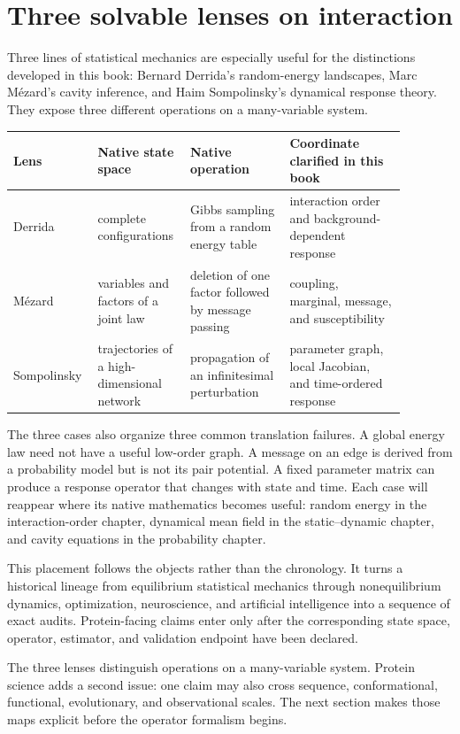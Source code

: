 \section{Three solvable lenses on interaction}

Three lines of statistical mechanics are especially useful for the distinctions developed in this
book: Bernard Derrida's random-energy landscapes, Marc M\'ezard's cavity inference, and Haim
Sompolinsky's dynamical response theory.  They expose three different operations on a
many-variable system.

\begin{center}
\small
\begin{tabular}{@{}>{\raggedright\arraybackslash}p{0.16\linewidth}
                >{\raggedright\arraybackslash}p{0.20\linewidth}
                >{\raggedright\arraybackslash}p{0.24\linewidth}
                >{\raggedright\arraybackslash}p{0.28\linewidth}@{}}
\toprule
Lens & Native state space & Native operation & Coordinate clarified in this book \\
\midrule
Derrida & complete configurations & Gibbs sampling from a random energy table & interaction order and background-dependent response \\
M\'ezard & variables and factors of a joint law & deletion of one factor followed by message passing & coupling, marginal, message, and susceptibility \\
Sompolinsky & trajectories of a high-dimensional network & propagation of an infinitesimal perturbation & parameter graph, local Jacobian, and time-ordered response \\
\bottomrule
\end{tabular}
\end{center}

The three cases also organize three common translation failures.  A global energy law need not have
a useful low-order graph.  A message on an edge is derived from a probability model but is not its
pair potential.  A fixed parameter matrix can produce a response operator that changes with state
and time.  Each case will reappear where its native mathematics becomes useful: random energy in
the interaction-order chapter, dynamical mean field in the static--dynamic chapter, and cavity
equations in the probability chapter.

This placement follows the objects rather than the chronology.  It turns a historical lineage
from equilibrium statistical mechanics through nonequilibrium dynamics, optimization,
neuroscience, and artificial intelligence into a sequence of exact audits.  Protein-facing
claims enter only after the corresponding state space, operator, estimator, and validation
endpoint have been declared.

The three lenses distinguish operations on a many-variable system.  Protein science adds a second
issue: one claim may also cross sequence, conformational, functional, evolutionary, and
observational scales.  The next section makes those maps explicit before the operator formalism
begins.

